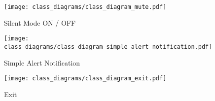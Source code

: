 \begin{figure}[]
	\centering
    \caption{Silent Mode ON / OFF}\label{fig:cls_silent_mode}
    \texttt{[image: class\_diagrams/class\_diagram\_mute.pdf]}
\end{figure}

\begin{figure}[]
	\centering
    \caption{Simple Alert Notification}\label{fig:cls_simple_alert_notification}
    \texttt{[image: class\_diagrams/class\_diagram\_simple\_alert\_notification.pdf]}
\end{figure}

\begin{figure}[]
	\centering
    \caption{Exit}\label{fig:cls_exit}
    \texttt{[image: class\_diagrams/class\_diagram\_exit.pdf]}
\end{figure}
